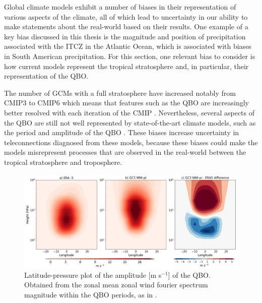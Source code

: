 Global climate models exhibit a number of biases in their representation of various aspects of the climate, all of which lead to uncertainty in our ability to make statements about the real-world based on their results. One example of a key bias discussed in this thesis is the magnitude and position of precipitation associated with the ITCZ in the Atlantic Ocean, which is associated with biases in South American precipitation. %
For this section, one relevant bias to consider is how current models represent the tropical stratosphere and, in particular, their representation of the QBO.

The number of GCMs with a full stratosphere have increased notably from CMIP3 to CMIP6 which means that features such as the QBO are increasingly better resolved with each iteration of the CMIP \citep{bushell2020,richter2020}. Nevertheless, several aspects of the QBO are still not well represented by state-of-the-art climate models, such as the period and amplitude of the QBO \citep{schenzinger2017,richter2020}. 
These biases increase uncertainty in teleconnections diagnosed from these models, because these biases could make the models misrepresent processes that are observed in the real-world between the tropical stratosphere and troposphere.

\begin{figure}[t!]
\centering
 \includegraphics[width=\linewidth]{figures/qboamplitude.png}
\caption[QBO amplitude bias]{Latitude-pressure plot of the amplitude [m s$^{-1}$] of the QBO. Obtained from the zonal mean zonal wind fourier spectrum magnitude within the QBO periods, as in \cite{schenzinger2017}. }
\label{fig:qboamplitude}
\end{figure}

